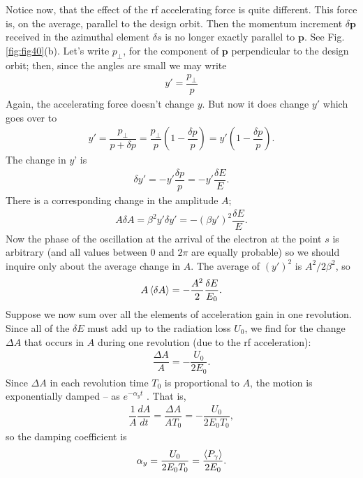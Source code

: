 Notice now, that the effect of the rf accelerating force is quite different. This force is, on the average, parallel to the design orbit. Then the momentum increment $\delta\bm{p}$ received in the azimuthal element $\delta s$ is no longer exactly parallel to $\bm{p}$. See Fig. \ref{fig:fig40}(b). Let's write $p_\perp$, for the component of $\bm{p}$ perpendicular to the design orbit; then, since the angles are small we may write
\begin{align}
	y' = \dfrac{p_\perp}{p}
\end{align}
Again, the accelerating force doesn't change $y$. But now it does change $y'$ which goes over to
\begin{align}
	y' = \dfrac{p_\perp}{p + \delta p} = \dfrac{p_\perp}{p} \left( 1 - \dfrac{\delta p}{p} \right) = y' \left( 1 - \dfrac{\delta p}{p} \right).
\end{align}
The change in $y’$ is
\begin{align}
	\delta y' = -y' \dfrac{\delta p}{p} = -y' \dfrac{\delta E}{E}.
\end{align}
There is a corresponding change in the amplitude $A$;
\begin{align}
	A \delta A = \beta^2 y' \delta y' = -(\beta y')^2 \dfrac{\delta E}{E}.
\end{align}
Now the phase of the oscillation at the arrival of the electron at the point $s$ is arbitrary
 (and all values between $0$ and $2\pi$ are equally probable) so we should inquire only about the average change in $A$. The average of $(y')^2$ is $A^2/2\beta^2$, so
\begin{align}
	A \left< \delta A \right> = - \dfrac{A^2}{2} \dfrac{\delta E}{E_0}.
\end{align}
Suppose we now sum over all the elements of acceleration gain in one revolution. Since all of the $\delta E$ must add up to the radiation loss $U_0$, we find for the change $\Delta A$ that occurs in $A$ during one revolution (due to the rf acceleration):
\begin{align}
	\dfrac{\Delta A}{A} = - \dfrac{U_0}{2 E_0}.
\end{align}
Since $\Delta A$ in each revolution time $T_0$ is proportional to $A$, the motion is exponentially damped -- as $e^{-\alpha_y t}$ . That is,
\begin{align} \label{eq:4.31}
	\dfrac{1}{A} \dfrac{dA}{dt} = \dfrac{\Delta A}{A T_0} = - \dfrac{U_0}{2 E_0 T_0},
\end{align}
so the damping coefficient is
\begin{align}
	\alpha_y = \dfrac{U_0}{2 E_0 T_0} = \dfrac{\left< P_\gamma \right>}{2 E_0}.
\end{align}
